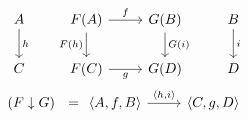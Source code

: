 \begin{example}
  \[
    \begin{gathered}
      \begin{tikzcd}[ampersand replacement=\&]
        A \& {F(A)} \& {G(B)} \& B \\
        C \& {F(C)} \& {G(D)} \& D
        \arrow["{F(h)}"', from=1-2, to=2-2]
        \arrow["{G(i)}", from=1-3, to=2-3]
        \arrow["f", from=1-2, to=1-3]
        \arrow["g"', from=2-2, to=2-3]
        \arrow["h", from=1-1, to=2-1]
        \arrow["i", from=1-4, to=2-4]
      \end{tikzcd}\\
      (F\downarrow G)\ \ =
      \begin{tikzcd}[ampersand replacement=\&]
        {\langle A,f,B\rangle} \& {\langle C,g,D\rangle}
        \arrow["{\langle h,i\rangle}", from=1-1, to=1-2]
      \end{tikzcd}
    \end{gathered}
  \]
\end{example}
